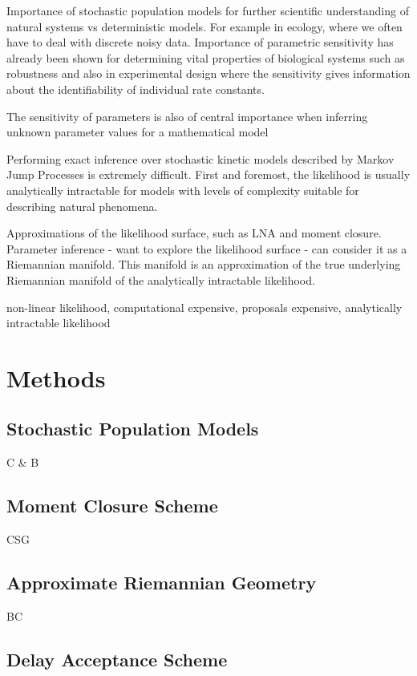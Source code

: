 \documentclass[useAMS,usenatbib,referee]{example/biom}
\begin{document}
Importance of stochastic population models for further scientific understanding of natural systems vs deterministic models.  For example in ecology, where we often have to deal with discrete noisy data.  Importance of parametric sensitivity has already been shown for determining vital properties of biological systems such as robustness and also in experimental design where the sensitivity gives information about the identifiability of individual rate constants.

The sensitivity of parameters is also of central importance when inferring unknown parameter values for a mathematical model

Performing exact inference over stochastic kinetic models described by Markov Jump Processes is extremely difficult.  First and foremost, the likelihood is usually analytically intractable for models with levels of complexity suitable for describing natural phenomena.

Approximations of the likelihood surface, such as LNA and moment closure.  Parameter inference - want to explore the likelihood surface - can consider it as a Riemannian manifold.  This manifold is an approximation of the true underlying Riemannian manifold of the analytically intractable likelihood.

non-linear likelihood, computational expensive, proposals expensive, analytically intractable likelihood


\section{Methods}

\subsection{Stochastic Population Models}

C \& B

\subsection{Moment Closure Scheme}

CSG

\subsection{Approximate Riemannian Geometry}
BC

\subsection{Delay Acceptance Scheme}
\end{document}
